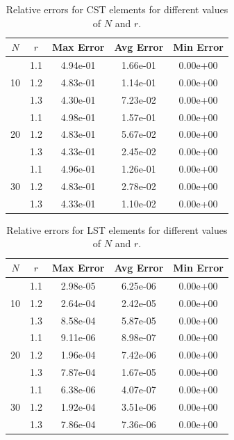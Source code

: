 \documentclass[12pt]{article}
\begin{document}
\begin{table}[H]
\centering
\caption{Relative errors for CST elements for different values of $N$ and $r$.}
\begin{tabular}{|c|c|c|c|c|}
\hline
\textbf{$N$} & \textbf{$r$} & \textbf{Max Error} & \textbf{Avg Error} & \textbf{Min Error} \\
\hline
\multirow{3}{*}{10}
& 1.1 & 4.94e-01 & 1.66e-01 & 0.00e+00 \\
& 1.2 & 4.83e-01 & 1.14e-01 & 0.00e+00 \\
& 1.3 & 4.30e-01 & 7.23e-02 & 0.00e+00 \\
\hline
\multirow{3}{*}{20}
& 1.1 & 4.98e-01 & 1.57e-01 & 0.00e+00 \\
& 1.2 & 4.83e-01 & 5.67e-02 & 0.00e+00 \\
& 1.3 & 4.33e-01 & 2.45e-02 & 0.00e+00 \\
\hline
\multirow{3}{*}{30}
& 1.1 & 4.96e-01 & 1.26e-01 & 0.00e+00 \\
& 1.2 & 4.83e-01 & 2.78e-02 & 0.00e+00 \\
& 1.3 & 4.33e-01 & 1.10e-02 & 0.00e+00 \\
\hline
\end{tabular}
\label{tab:cst_errors_refined}
\end{table}

\begin{table}[H]
\centering
\caption{Relative errors for LST elements for different values of $N$ and $r$.}
\begin{tabular}{|c|c|c|c|c|}
\hline
\textbf{$N$} & \textbf{$r$} & \textbf{Max Error} & \textbf{Avg Error} & \textbf{Min Error} \\
\hline
\multirow{3}{*}{10}
& 1.1 & 2.98e-05 & 6.25e-06 & 0.00e+00 \\
& 1.2 & 2.64e-04 & 2.42e-05 & 0.00e+00 \\
& 1.3 & 8.58e-04 & 5.87e-05 & 0.00e+00 \\
\hline
\multirow{3}{*}{20}
& 1.1 & 9.11e-06 & 8.98e-07 & 0.00e+00 \\
& 1.2 & 1.96e-04 & 7.42e-06 & 0.00e+00 \\
& 1.3 & 7.87e-04 & 1.67e-05 & 0.00e+00 \\
\hline
\multirow{3}{*}{30}
& 1.1 & 6.38e-06 & 4.07e-07 & 0.00e+00 \\
& 1.2 & 1.92e-04 & 3.51e-06 & 0.00e+00 \\
& 1.3 & 7.86e-04 & 7.36e-06 & 0.00e+00 \\
\hline
\end{tabular}
\label{tab:lst_errors_refined}
\end{table}
\end{document}
